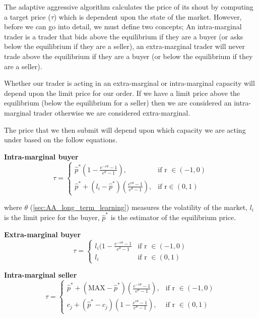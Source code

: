 \documentclass[preprint]{acm_proc_article-sp} %
\begin{document}
The adaptive aggressive algorithm calculates the price of its shout by
computing a target price ($\tau$) which is dependent upon
the state of the market. However, before we can go into detail, we must define
two concepts; An intra-marginal trader is a trader that bids above the
equilibrium if they are a buyer (or asks below the equilibrium if they are a
seller), an extra-marginal trader will never trade above the
equilibrium if they are a buyer (or below the equilibrium if they are a
seller).

Whether our trader is acting in an extra-marginal or intra-marginal capacity
will depend upon the limit price for our order. If we have a limit price above
the equilibrium (below the equilibrium for a seller) then we are considered an
intra-marginal trader otherwise we are considered extra-marginal.

The price that we then submit will depend upon which capacity we are acting
under based on the follow equations.

\textbf{Intra-marginal buyer}
\begin{equation}
    \label{eqn:intrabuyer}
    \tau =
    \begin{cases}
        \hat{p}^*(1- \frac{e^{-r\theta}-1}{e^{\theta}-1}), &  \text{if r } \in (-1,0)  \\
        \hat{p}^* + (l_i-\hat{p}^*)(\frac{e^{r\theta}-1}{e^\theta-1}), & \text{if r} \in (0,1)
    \end{cases}
\end{equation}

where $\theta$ (\ref{sec:AA_long_term_learning}) measures the volatility of the
market, $l_i$ is the limit price for the buyer, $\hat{p}^*$ is the estimator of the
equilibrium price.

\textbf{Extra-marginal buyer}
\begin{equation}
    \label{eqn:extrabuyer}
    \tau =
    \begin{cases}
        l_i(1-\frac{e^{-r\theta}-1}{e^\theta-1} &  \text{if r } \in (-1,0)  \\
        l_i & \text{if r } \in (0,1)
    \end{cases}
\end{equation}

\textbf{Intra-marginal seller}
\begin{equation}
    \label{eqn:intraseller}
    \tau =
    \begin{cases}
        \hat{p}^* + (\text{MAX}-\hat{p}^*)( \frac{e^{-r\theta}-1}{e^{\theta}-1}), &  \text{if r } \in (-1,0)  \\
        c_j + (\hat{p}^*-c_j)(1-\frac{e^{r\theta}-1}{e^\theta-1}), & \text{if r } \in (0,1)
    \end{cases}
\end{equation}
\end{document}
